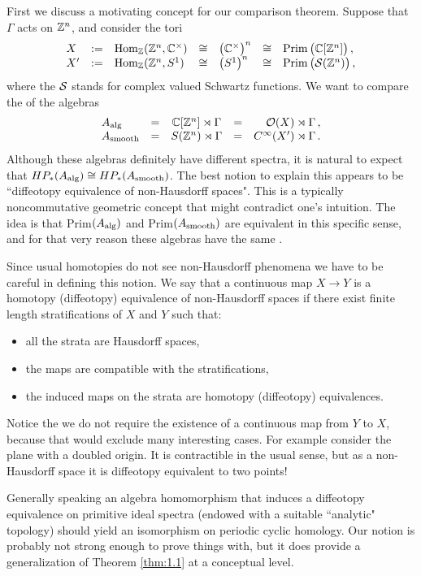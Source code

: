 First we discuss a motivating concept for our comparison theorem.
Suppose that $\Gamma$ acts on $\mathbb Z^n$, and consider the tori
\[
\begin{array}{lllllll}
X & := & \mathrm{Hom}_{\mathbb Z}(\mathbb Z^n ,\mathbb C^\times) & \cong &
\big( \mathbb C^\times \big)^n & \cong &
\mathrm{Prim} \, \big( \mathbb C [\mathbb Z^n ] \big) \,, \\
X' & := & \mathrm{Hom}_{\mathbb Z}(\mathbb Z^n ,S^1) & \cong & \big( S^1 \big)^n
& \cong &\mathrm{Prim} \, \big( \mathcal S (\mathbb Z^n )\big) \,,
\end{array}
\]
where the $\mathcal S$ stands for complex valued Schwartz functions. We
want to compare the \pch of the algebras
\[
\begin{array}{lcccr}
A_\mathrm{alg} & = & \mathbb C [\mathbb Z^n ] \rtimes \Gamma & = & \mathcal O (X) \rtimes
\Gamma \,, \\
A_\mathrm{smooth} & = & S (\mathbb Z^n ) \rtimes \Gamma & = & C^\infty (X') \rtimes
\Gamma \,.
\end{array}
\]
Although these algebras definitely have different spectra, it is
natural to expect that $HP_* (A_\mathrm{alg} ) \cong HP_* (A_\mathrm{smooth} )$.
The best notion to explain this appears to be ``diffeotopy equivalence of
non-Hausdorff spaces". This is a typically noncommutative geometric
concept that might contradict one's intuition. The idea is that Prim$ (A_\mathrm{alg} )$
and Prim$ (A_\mathrm{smooth} )$ are equivalent in this specific sense, and for that very 
reason these algebras have the same \pch \!. 

Since usual homotopies do not see non-Hausdorff phenomena we have
to be careful in defining this notion. We say that a continuous map
$X \to Y$ is a homotopy (diffeotopy) equivalence of non-Hausdorff
spaces if there exist finite length stratifications of $X$ and $Y$ such that:
\begin{itemize}
\item all the strata are Hausdorff spaces,
\item the maps are compatible with the stratifications,
\item the induced maps on the strata are homotopy (diffeotopy) equivalences.
\end{itemize}
Notice the we do not require the existence of a continuous map from $Y$ to 
$X$, because that would exclude many interesting cases.
For example consider the plane with a doubled origin. It is contractible in the usual
sense, but as a non-Hausdorff space it is diffeotopy equivalent to two points!

Generally speaking an algebra homomorphism that induces a diffeotopy 
equivalence on primitive ideal spectra (endowed with a suitable ``analytic"
topology) should yield an isomorphism on periodic cyclic homology. Our notion
is probably not strong enough to prove things with, but it does provide
a generalization of Theorem \ref{thm:1.1} at a conceptual level. 

